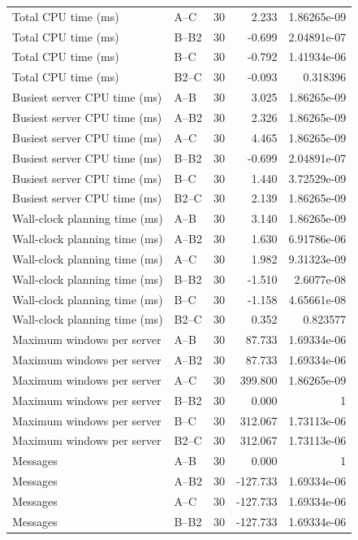 \begin{table}[t]
\begin{tabular}{llrrr}
Total CPU time (ms) & A--C & 30 & 2.233 & 1.86265e-09 \\
Total CPU time (ms) & B--B2 & 30 & -0.699 & 2.04891e-07 \\
Total CPU time (ms) & B--C & 30 & -0.792 & 1.41934e-06 \\
Total CPU time (ms) & B2--C & 30 & -0.093 & 0.318396 \\
Busiest server CPU time (ms) & A--B & 30 & 3.025 & 1.86265e-09 \\
Busiest server CPU time (ms) & A--B2 & 30 & 2.326 & 1.86265e-09 \\
Busiest server CPU time (ms) & A--C & 30 & 4.465 & 1.86265e-09 \\
Busiest server CPU time (ms) & B--B2 & 30 & -0.699 & 2.04891e-07 \\
Busiest server CPU time (ms) & B--C & 30 & 1.440 & 3.72529e-09 \\
Busiest server CPU time (ms) & B2--C & 30 & 2.139 & 1.86265e-09 \\
Wall-clock planning time (ms) & A--B & 30 & 3.140 & 1.86265e-09 \\
Wall-clock planning time (ms) & A--B2 & 30 & 1.630 & 6.91786e-06 \\
Wall-clock planning time (ms) & A--C & 30 & 1.982 & 9.31323e-09 \\
Wall-clock planning time (ms) & B--B2 & 30 & -1.510 & 2.6077e-08 \\
Wall-clock planning time (ms) & B--C & 30 & -1.158 & 4.65661e-08 \\
Wall-clock planning time (ms) & B2--C & 30 & 0.352 & 0.823577 \\
Maximum windows per server & A--B & 30 & 87.733 & 1.69334e-06 \\
Maximum windows per server & A--B2 & 30 & 87.733 & 1.69334e-06 \\
Maximum windows per server & A--C & 30 & 399.800 & 1.86265e-09 \\
Maximum windows per server & B--B2 & 30 & 0.000 & 1 \\
Maximum windows per server & B--C & 30 & 312.067 & 1.73113e-06 \\
Maximum windows per server & B2--C & 30 & 312.067 & 1.73113e-06 \\
Messages & A--B & 30 & 0.000 & 1 \\
Messages & A--B2 & 30 & -127.733 & 1.69334e-06 \\
Messages & A--C & 30 & -127.733 & 1.69334e-06 \\
Messages & B--B2 & 30 & -127.733 & 1.69334e-06 \\

\end{tabular}
\end{table}
